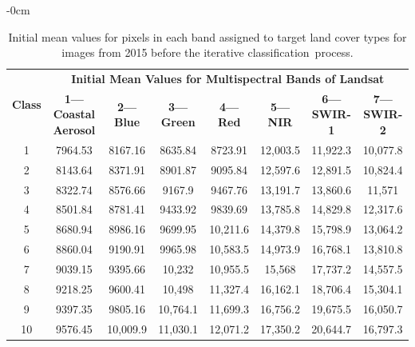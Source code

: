 \documentclass[jmse,article,accept,pdftex,oneauthor]{Definitions/mdpi}
\begin{document}
\begin{table}[H]
  \caption{Initial mean values for pixels in each band assigned to target land cover types for images from 2015 %
  	before the iterative classification~process.   \label{tabA2} }

\begin{adjustwidth}{-\extralength}{0cm}
 \setlength{\tabcolsep}{3.6mm}
   \begin{tabular}{cccccccc}
  \toprule
  \multirow{2}{*}{\textbf{Class}} & \multicolumn{7}{c}{\textbf{Initial Mean Values for Multispectral Bands of Landsat}} \\
     & \textbf{1---Coastal Aerosol} & \textbf{2---Blue} & \textbf{3---Green} & \textbf{4---Red} & \textbf{5---NIR} & \textbf{6---SWIR-1} & \textbf{7---SWIR-2} \\
    \midrule %
    1 & 7964.53 & 8167.16 & 8635.84 & 8723.91 & 12,003.5 & 11,922.3 & 10,077.8 \\
    2 & 8143.64 & 8371.91 & 8901.87 & 9095.84 & 12,597.6 & 12,891.5 & 10,824.4  \\
    3 & 8322.74 & 8576.66 & 9167.9 & 9467.76 & 13,191.7 & 13,860.6 & 11,571 \\
    4 & 8501.84 & 8781.41 & 9433.92 & 9839.69 & 13,785.8 & 14,829.8 & 12,317.6 \\
    5 & 8680.94 & 8986.16 & 9699.95 & 10,211.6 & 14,379.8 & 15,798.9 & 13,064.2 \\
    6 & 8860.04 & 9190.91 & 9965.98 & 10,583.5 & 14,973.9 & 16,768.1 & 13,810.8 \\
    7 & 9039.15 & 9395.66 & 10,232 & 10,955.5 & 15,568 & 17,737.2 & 14,557.5 \\
    8 & 9218.25 & 9600.41 & 10,498 & 11,327.4 & 16,162.1 & 18,706.4 & 15,304.1 \\
    9 & 9397.35 & 9805.16 & 10,764.1 & 11,699.3 & 16,756.2 & 19,675.5 & 16,050.7 \\
    10 & 9576.45 & 10,009.9 & 11,030.1 & 12,071.2 &17,350.2 & 20,644.7 & 16,797.3 \\
\bottomrule
\end{tabular}
\end{adjustwidth}


\end{table}
\unskip 
\end{document}
